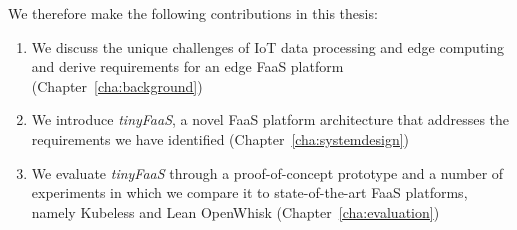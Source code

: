 We therefore make the following contributions in this thesis:

\begin{enumerate}
  \item We discuss the unique challenges of IoT data processing and edge computing and derive requirements for an edge FaaS platform (Chapter~\ref{cha:background})
  \item We introduce \textit{tinyFaaS}, a novel FaaS platform architecture that addresses the requirements we have identified (Chapter~\ref{cha:systemdesign})
  \item We evaluate \textit{tinyFaaS} through a proof-of-concept prototype and a number of experiments in which we compare it to state-of-the-art FaaS platforms, namely Kubeless and Lean OpenWhisk (Chapter~\ref{cha:evaluation})
\end{enumerate}
